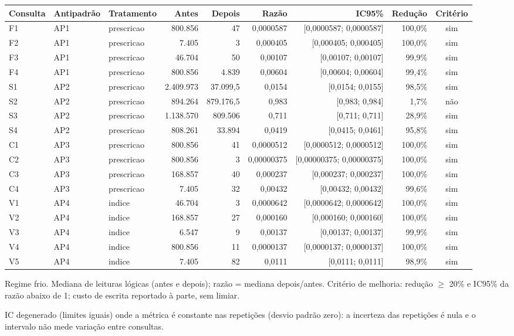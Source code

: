 {\small\setlength{\tabcolsep}{4pt}
\begin{tabular}{lllrrrrrc}
\toprule
Consulta & Antipadrão & Tratamento & Antes & Depois & Razão & IC95\% & Redução & Critério \\
\midrule
F1 & AP1 & prescricao & 800.856 & 47 & 0,0000587 & [0,0000587; 0,0000587] & 100,0\% & sim \\
F2 & AP1 & prescricao & 7.405 & 3 & 0,000405 & [0,000405; 0,000405] & 100,0\% & sim \\
F3 & AP1 & prescricao & 46.704 & 50 & 0,00107 & [0,00107; 0,00107] & 99,9\% & sim \\
F4 & AP1 & prescricao & 800.856 & 4.839 & 0,00604 & [0,00604; 0,00604] & 99,4\% & sim \\
S1 & AP2 & prescricao & 2.409.973 & 37.099,5 & 0,0154 & [0,0154; 0,0155] & 98,5\% & sim \\
S2 & AP2 & prescricao & 894.264 & 879.176,5 & 0,983 & [0,983; 0,984] & 1,7\% & não \\
S3 & AP2 & prescricao & 1.138.570 & 809.506 & 0,711 & [0,711; 0,711] & 28,9\% & sim \\
S4 & AP2 & prescricao & 808.261 & 33.894 & 0,0419 & [0,0415; 0,0461] & 95,8\% & sim \\
C1 & AP3 & prescricao & 800.856 & 41 & 0,0000512 & [0,0000512; 0,0000512] & 100,0\% & sim \\
C2 & AP3 & prescricao & 800.856 & 3 & 0,00000375 & [0,00000375; 0,00000375] & 100,0\% & sim \\
C3 & AP3 & prescricao & 168.857 & 40 & 0,000237 & [0,000237; 0,000237] & 100,0\% & sim \\
C4 & AP3 & prescricao & 7.405 & 32 & 0,00432 & [0,00432; 0,00432] & 99,6\% & sim \\
V1 & AP4 & indice & 46.704 & 3 & 0,0000642 & [0,0000642; 0,0000642] & 100,0\% & sim \\
V2 & AP4 & indice & 168.857 & 27 & 0,000160 & [0,000160; 0,000160] & 100,0\% & sim \\
V3 & AP4 & indice & 6.547 & 9 & 0,00137 & [0,00137; 0,00137] & 99,9\% & sim \\
V4 & AP4 & indice & 800.856 & 11 & 0,0000137 & [0,0000137; 0,0000137] & 100,0\% & sim \\
V5 & AP4 & indice & 7.405 & 82 & 0,0111 & [0,0111; 0,0111] & 98,9\% & sim \\
\bottomrule
\end{tabular}\par
\vspace{3pt}
\begin{minipage}{\linewidth}\footnotesize
Regime frio. Mediana de leituras lógicas (antes e depois); razão = mediana depois/antes. Critério de melhoria: redução $\geq$ 20\% e IC95\% da razão abaixo de 1; custo de escrita reportado à parte, sem limiar.\par
IC degenerado (limites iguais) onde a métrica é constante nas repetições (desvio padrão zero): a incerteza das repetições é nula e o intervalo não mede variação entre consultas.
\end{minipage}
}
